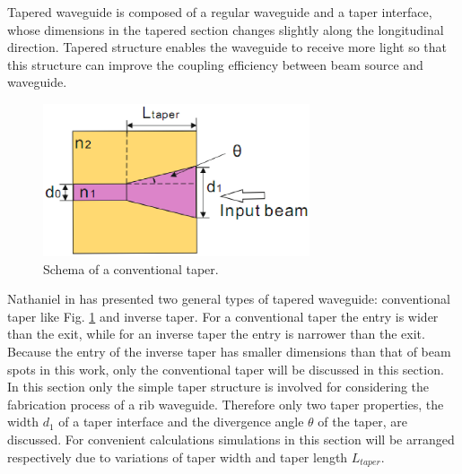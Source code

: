 Tapered waveguide is composed of a regular waveguide and a taper interface, whose dimensions in the tapered section changes slightly along the longitudinal direction\cite{linear_tapered_waveguides}. Tapered structure enables the waveguide to receive more light so that this structure can improve the coupling efficiency between beam source and waveguide.\\  

\begin{figure}[!ht]
\centering
\includegraphics[width=0.7\textwidth]{bilder/convernational_taper}
\caption{Schema of a conventional taper.}
\label{fig:conventional_taper}
\end{figure}
Nathaniel in \cite{design_fabrication_tapered_waveguide} has presented two general types of tapered waveguide: conventional taper like Fig. \ref{fig:conventional_taper} and inverse taper. For a conventional taper the entry is wider than the exit, while for an inverse taper the entry is narrower than the exit. Because the entry of the inverse taper has smaller dimensions than that of beam spots in this work, only the conventional taper will be discussed in this section.\\

In this section only the simple taper structure is involved for considering the fabrication process of a rib waveguide. Therefore only two taper properties, the width $d_{1}$ of a taper interface and the divergence angle $\theta$ of the taper, are discussed. For convenient calculations simulations in this section will be arranged respectively due to variations of taper width and taper length $L_{taper}$.
